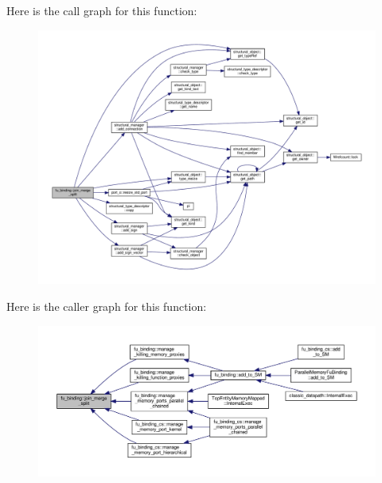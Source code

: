 Here is the call graph for this function\+:
\nopagebreak
\begin{figure}[H]
\begin{center}
\leavevmode
\includegraphics[width=350pt]{d8/d04/classfu__binding_a7f20518e1518f5ad76bd1cce7cc010eb_cgraph}
\end{center}
\end{figure}
Here is the caller graph for this function\+:
\nopagebreak
\begin{figure}[H]
\begin{center}
\leavevmode
\includegraphics[width=350pt]{d8/d04/classfu__binding_a7f20518e1518f5ad76bd1cce7cc010eb_icgraph}
\end{center}
\end{figure}
\mbox{\label{classfu__binding_a0c1d997736c70885bf9fcd71ac1c5a16}} 
